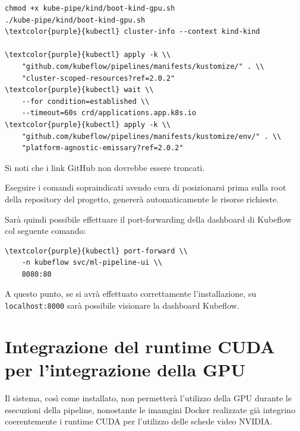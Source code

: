 \begin{small}
\begin{Verbatim}[commandchars=\\\{\}]
chmod +x kube-pipe/kind/boot-kind-gpu.sh
./kube-pipe/kind/boot-kind-gpu.sh
\textcolor{purple}{kubectl} cluster-info --context kind-kind

\textcolor{purple}{kubectl} apply -k \\ 
    "github.com/kubeflow/pipelines/manifests/kustomize/" . \\
    "cluster-scoped-resources?ref=2.0.2"
\textcolor{purple}{kubectl} wait \\
    --for condition=established \\ 
    --timeout=60s crd/applications.app.k8s.io
\textcolor{purple}{kubectl} apply -k \\ 
    "github.com/kubeflow/pipelines/manifests/kustomize/env/" . \\
    "platform-agnostic-emissary?ref=2.0.2"
\end{Verbatim}
\end{small}

Si noti che i link GitHub non dovrebbe essere troncati.

Eseguire i comandi sopraindicati avendo cura di posizionarsi prima sulla root della repository del progetto, genererà automaticamente le risorse richieste.

Sarà quindi possibile effettuare il port-forwarding della dashboard di Kubeflow col seguente comando:

\begin{small}
\begin{Verbatim}[commandchars=\\\{\}]
\textcolor{purple}{kubectl} port-forward \\ 
    -n kubeflow svc/ml-pipeline-ui \\ 
    8080:80
\end{Verbatim}
\end{small}

A questo punto, se si avrà effettuato correttamente l'installazione, su {\small \verb|localhost:8000|} sarà possibile visionare la dashboard Kubeflow.


\section{Integrazione del runtime CUDA per l'integrazione della GPU}

Il sistema, così come installato, non permetterà l'utilizzo della GPU durante le esecuzioni della pipeline, nonostante le imamgini Docker realizzate già integrino coerentemente i runtime CUDA per l'utilizzo delle schede video NVIDIA.

